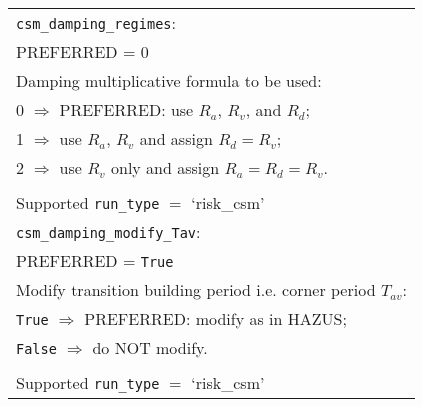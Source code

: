 \begin{tabular}{|p{\textwidth}|}
\hline \vspace{0.1em} \texttt{csm\_damping\_regimes}: \\
PREFERRED = 0 \\
 Damping multiplicative formula to be
used: \\
 \hspace{0.5em} 0 $\Rightarrow$ \small{PREFERRED}: use $R_a$, $R_v$, and $R_d$; \\
 \hspace{0.5em} 1 $\Rightarrow$ use $R_a$, $R_v$ and assign $R_d= R_v$; \\
 \hspace{0.5em} 2 $\Rightarrow$ use $R_v$ only and assign $R_a=R_d=R_v$. \\
 \\
Supported \texttt{run\_type} $=$ `risk\_csm' \\
\hline \vspace{0.1em} \texttt{csm\_damping\_modify\_Tav}: \\
PREFERRED = \texttt{True} \\
Modify transition building period i.e. corner period $T_{av}$: \\
 \hspace{0.5em} \texttt{True} $\Rightarrow$ \small{PREFERRED}: modify as in HAZUS; \\
 \hspace{0.5em}  \texttt{False} $\Rightarrow$ do NOT modify. \\
\\
Supported \texttt{run\_type} $=$ `risk\_csm' \\
 \hline
\end{tabular}




